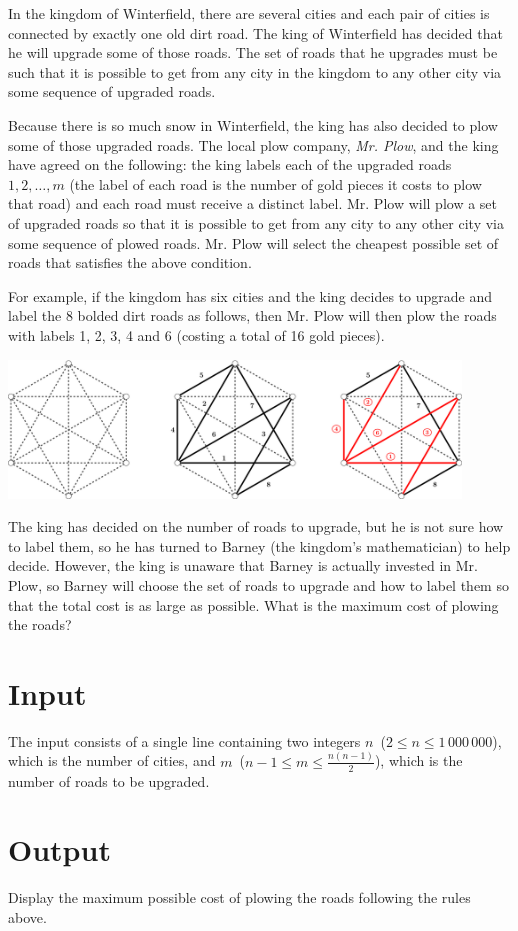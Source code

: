 
In the kingdom of Winterfield, there are several cities and each pair of cities is connected by exactly one old dirt road. The king of Winterfield has decided that he will upgrade some of those roads. The set of roads that he upgrades must be such that it is possible to get from any city in the kingdom to any other city via some sequence of upgraded roads.

Because there is so much snow in Winterfield, the king has also decided to plow some of those upgraded roads. The local plow company, \textit{Mr. Plow}, and the king have agreed on the following: the king labels each of the upgraded roads $1, 2, \dots, m$ (the label of each road is the number of gold pieces it costs to plow that road) and each road must receive a distinct label. Mr. Plow will plow a set of upgraded roads so that it is possible to get from any city to any other city via some sequence of plowed roads. Mr. Plow will select the cheapest possible set of roads that satisfies the above condition.

For example, if the kingdom has six cities and the king decides to upgrade and label the 8 bolded dirt roads as follows, then Mr. Plow will then plow the roads with labels 1, 2, 3, 4 and 6 (costing a total of 16 gold pieces).

\begin{center}
\includegraphics[width=0.9\textwidth]{plow_img.png}
\end{center}
\vspace{10pt}

The king has decided on the number of roads to upgrade, but he is not sure how to label them, so he has turned to Barney (the kingdom's mathematician) to help decide. However, the king is unaware that Barney is actually invested in Mr. Plow, so Barney will choose the set of roads to upgrade and how to label them so that the total cost is as large as possible. What is the maximum cost of plowing the roads?


\section*{Input}

The input consists of a single line containing two integers $n$~($2 \leq n \leq 1\,000\,000$), which is the number of cities, and $m$~($n-1 \leq m \leq \frac{n(n-1)}{2}$), which is the number of roads to be upgraded.


\section*{Output}

Display the maximum possible cost of plowing the roads following the rules above.

